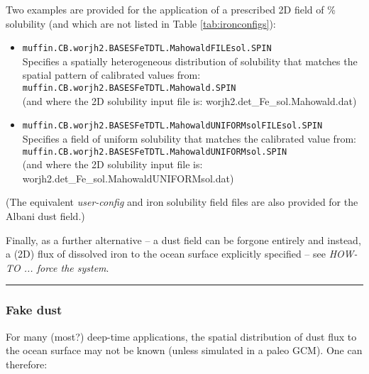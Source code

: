 \vspace{1mm}
Two examples are provided for the application of a prescribed 2D field of \% solubility (and which are not listed in Table \ref{tab:ironconfigs}):
\begin{itemize}[noitemsep]
\vspace{1mm}
\item \texttt{muffin.CB.worjh2.BASESFeTDTL.MahowaldFILEsol.SPIN}
\\Specifies a spatially heterogeneous distribution of solubility that matches the  spatial pattern of calibrated values  from:
\\\texttt{\small muffin.CB.worjh2.BASESFeTDTL.Mahowald.SPIN}
\\(and where the 2D solubility input file is: \textsf{\footnotesize worjh2.det\_Fe\_sol.Mahowald.dat})
\vspace{1mm}
\item \texttt{muffin.CB.worjh2.BASESFeTDTL.MahowaldUNIFORMsolFILEsol.SPIN}
\\Specifies a field of uniform solubility that matches the calibrated value from:
\\\texttt{\small muffin.CB.worjh2.BASESFeTDTL.MahowaldUNIFORMsol.SPIN}
\\(and where the 2D solubility input file is: \textsf{\footnotesize worjh2.det\_Fe\_sol.MahowaldUNIFORMsol.dat})
\end{itemize}
\vspace{1mm}
(The equivalent \textit{user-config} and iron solubility field files are also provided for the Albani dust field.) 

\vspace{2mm}
\noindent Finally, as a further alternative -- a dust field can be forgone entirely and instead, a (2D) flux of dissolved iron to the ocean surface explicitly specified -- see \textit{HOW-TO ... force the system}.

%
\noindent\rule{4cm}{0.5pt}
\subsubsection{Fake dust}
\vspace{1mm}

For many (most?) deep-time applications, the spatial distribution of dust flux to the ocean surface may not be known (unless simulated in a paleo GCM). One can therefore:

